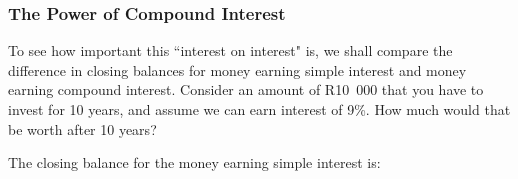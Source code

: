       \label{m39334*uid63}
            \subsubsection{ The Power of Compound Interest}
            \nopagebreak
            
        
        \label{m39334*id73519}To see how important this ``interest on interest" is, we shall compare the difference in closing balances for money earning simple interest and money earning compound interest. Consider an amount of R10~000 that you have to invest for 10 years, and assume we can earn interest of 9\%. How much would that be worth after 10 years?\par 
        \label{m39334*id73528}The closing balance for the money earning simple interest is:\par 
        \label{m39334*id73532}\nopagebreak\noindent{}
    
